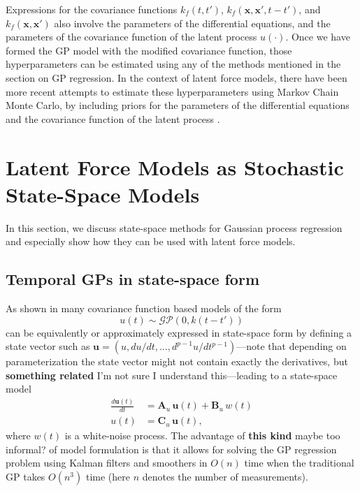 \documentclass[journal]{IEEEtran}
\newcommand{\mauricio}[1]{{\color{blue}#1}}
\begin{document}
Expressions for the covariance functions $k_{f}(t,t')$, $k_{f}(\mathbf{x}, \mathbf{x}', t-t')$, and $k_{f}(\mathbf{x}, \mathbf{x}')$ also involve the parameters of the differential equations, and the parameters of the covariance function of the latent process $u(\cdot)$. Once we have formed the GP model with the modified covariance function, those hyperparameters can be estimated using any of the methods mentioned in the section on GP regression. In the context of latent force models, there have been more recent
attempts to estimate these hyperparameters using Markov Chain Monte Carlo, by including priors for the parameters of the differential equations and the covariance function of the latent process \cite{Titsias:control:vars:2009, Titsias:BMC:2012}.


\section{Latent Force Models as Stochastic State-Space Models}

In this section, we discuss state-space methods for Gaussian process regression and especially show how they can be used with latent force models. 

\subsection{Temporal GPs in state-space form} \label{sec:tempgp}
As shown in \cite{Hartikainen+Sarkka:2010,Sarkka+Solin+Hartikainen:2013,Sarkka+Piche:2014} many covariance function based models of the form
%
\begin{equation}
  u(t) \sim \mathcal{GP}(0,k(t - t'))
\end{equation}
%
can be equivalently or approximately expressed in state-space form by defining a state vector such as $\mathbf{u} = (u,
du/dt,\ldots,d^{p-1}u/dt^{p-1})$---note that depending on parameterization the state vector might not contain exactly
the derivatives, but \mauricio{\textbf{something related} I'm not sure I understand this}---leading to a state-space model
%
\begin{equation}
\begin{split}
  \frac{d\mathbf{u}(t)}{dt}
  &= \mathbf{A}_u \, \mathbf{u}(t) + \mathbf{B}_u \, w(t) \\
  u(t) &= \mathbf{C}_u \, \mathbf{u}(t),
\end{split}
\label{eq:ssu}
\end{equation}
%
where $w(t)$ is a white-noise process. The advantage of \mauricio{\textbf{this kind} maybe too informal?} of model formulation is that it allows for solving the GP regression problem using Kalman filters and smoothers \cite{Sarkka:2013} in $O(n)$ time when the traditional GP takes $O(n^3)$ time (here $n$ denotes the number of measurements).
\end{document}
